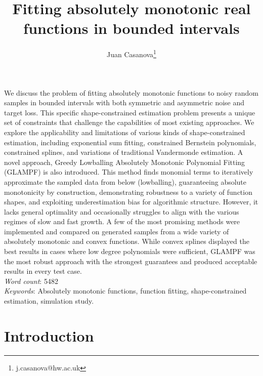 \documentclass[12pt,a4paper]{article}
\title{Fitting absolutely monotonic real functions in bounded intervals}
\author{Juan Casanova\thanks{j.casanova@hw.ac.uk}}
\begin{document}
\maketitle

We discuss the problem of fitting absolutely monotonic functions to noisy random samples in bounded intervals with both symmetric and asymmetric noise and target loss. This specific shape-constrained estimation problem presents a unique set of constraints that challenge the capabilities of most existing approaches. We explore the applicability and limitations of various kinds of shape-constrained estimation, including exponential sum fitting, constrained Bernstein polynomials, constrained splines, and variations of traditional Vandermonde estimation. A novel approach, Greedy Lowballing Absolutely Monotonic Polynomial Fitting (GLAMPF) is also introduced. This method finds monomial terms to iteratively approximate the sampled data from below (lowballing), guaranteeing absolute monotonicity by construction, demonstrating robustness to a variety of function shapes, and exploiting underestimation bias for algorithmic structure. However, it lacks general optimality and occasionally struggles to align with the various regimes of slow and fast growth. A few of the most promising methods were implemented and compared on generated samples from a wide variety of absolutely monotonic and convex functions. While convex splines displayed the best results in cases where low degree polynomials were sufficient, GLAMPF was the most robust approach with the strongest guarantees and produced acceptable results in every test case.\\

{\emph{Word count}}: 5482\\

{\emph{Keywords}}: Absolutely monotonic functions, function fitting, shape-constrained estimation, simulation study.

\pagebreak
\tableofcontents

\section{Introduction}
\end{document}
